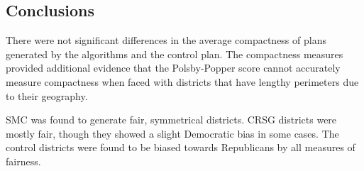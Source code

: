 \subsection{Conclusions}

There were not significant differences in the average compactness of plans generated by the algorithms and the control plan. The compactness measures provided additional evidence that the Polsby-Popper score cannot accurately measure compactness when faced with districts that have lengthy perimeters due to their geography. 

SMC was found to generate fair, symmetrical districts. CRSG districts were mostly fair, though they showed a slight Democratic bias in some cases. The control districts were found to be biased towards Republicans by all measures of fairness. 